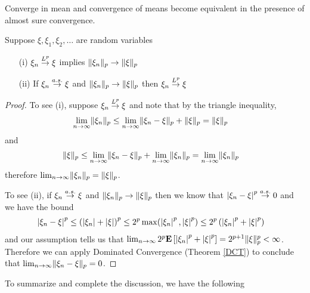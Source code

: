 Converge in mean and convergence of means become equivalent in the
presence of almost sure convergence.
\begin{lem}\label{ConvergenceInMeanConvergenceOfMeans}Suppose $\xi,
  \xi_1, \xi_2, \dotsc$ are random variables
\begin{itemize}
\item[(i)]$\xi_n \overset{L^p}\to \xi$ implies $\lVert \xi_n \rVert_p \to \lVert \xi \rVert_p$
\item[(ii)]If  $\xi_n \overset{a.s.}\to \xi$ and $\lVert \xi_n \rVert_p \to \lVert \xi \rVert_p$
then $\xi_n \overset{L^p}\to \xi$
\end{itemize}
\end{lem}
\begin{proof}
To see (i), suppose $\xi_n \overset{L^p}\to \xi$ and note that by the triangle inequality, 
\begin{align*}
\lim_{n \to \infty} \lVert \xi_n \rVert_p &\leq \lim_{n \to \infty}
\lVert \xi_n - \xi \rVert_p + \lVert \xi \rVert_p = \lVert \xi \rVert_p
\end{align*}
and
\begin{align*}
\lVert \xi \rVert_p &\leq \lim_{n \to \infty}
\lVert \xi_n - \xi \rVert_p + \lim_{n\to \infty} \lVert \xi_n \rVert_p = \lim_{n\to
  \infty} \lVert \xi_n \rVert_p
\end{align*}
therefore $\lim_{n\to  \infty} \lVert \xi_n \rVert_p = \lVert \xi \rVert_p$.

To see (ii), if $\xi_n \overset{a.s.}\to \xi$ and $\lVert \xi_n \rVert_p \to \lVert \xi \rVert_p$ then we
know that $\left \vert \xi_n - \xi \right \vert^p \overset{a.s.}\to 0$ and we have the bound
\begin{align*}
\left \vert \xi_n - \xi \right \vert^p &\leq \left( \left \vert \xi_n \right \vert + \left \vert \xi \right \vert\right )^p
\leq 2^p \max(\left \vert \xi_n \right \vert^p, \left \vert \xi \right \vert^p) \leq 2^p \left(
  \left \vert \xi_n \right \vert^p +  \left \vert \xi \right \vert^p\right)
\end{align*}
and our assumption tells us that $\lim_{n \to \infty} 2^p \textbf{E}\left[
  \left \vert \xi_n \right \vert^p +  \left \vert \xi \right \vert^p\right] = 2^{p+1} \lVert \xi \rVert_p^p < \infty$.
Therefore we can apply Dominated Convergence (Theorem \ref{DCT}) to conclude that $\lim_{n
  \to \infty} \lVert \xi_n - \xi \rVert_p = 0$.
\end{proof}

To summarize and complete the discussion, we have the following 

